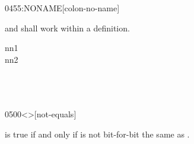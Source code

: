 \begin{worddef}{0455}{:NONAME}[colon-no-name]
\begin{rationale}
	\note {} and  shall work within
		a  definition.
	\end{rationale}

	\begin{testing}
	 nn1 \\
	 nn2 \\
	 \\
	 \\
	 \\
	\end{testing}
\end{worddef}


\begin{worddef}[ne]{0500}{<>}[not-equals]
\item {}

	 is true if and only if  is not bit-for-bit
	the same as .
\end{worddef}


